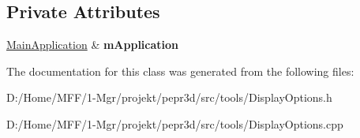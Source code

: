 \subsection*{Private Attributes}
\begin{DoxyCompactItemize}
\item 
\mbox{\label{classpepr3d_1_1_display_options_ae51e9da0c45d0fee1aac00df4bc5f313}} 
\mbox{\hyperlink{classpepr3d_1_1_main_application}{Main\+Application}} \& {\bfseries m\+Application}
\end{DoxyCompactItemize}


The documentation for this class was generated from the following files\+:\begin{DoxyCompactItemize}
\item 
D\+:/\+Home/\+M\+F\+F/1-\/\+Mgr/projekt/pepr3d/src/tools/Display\+Options.\+h\item 
D\+:/\+Home/\+M\+F\+F/1-\/\+Mgr/projekt/pepr3d/src/tools/Display\+Options.\+cpp\end{DoxyCompactItemize}
